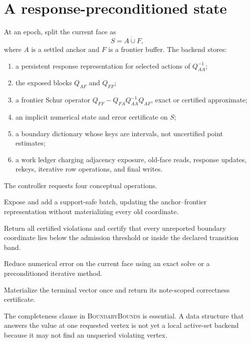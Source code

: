 \section{A response-preconditioned state}
\label{sec:state}

At an epoch, split the current face as
\begin{equation}
 S=A\mathbin{\dot\cup}F,
 \label{eq:anchor-frontier}
\end{equation}
where $A$ is a settled anchor and $F$ is a frontier buffer.  The backend stores:

\begin{enumerate}[label=(\roman*)]
\item a persistent response representation for selected actions of
      $Q_{AA}^{-1}$;
\item the exposed blocks $Q_{AF}$ and $Q_{FF}$;
\item a frontier Schur operator
      $Q_{FF}-Q_{FA}Q_{AA}^{-1}Q_{AF}$, exact or certified approximate;
\item an implicit numerical state and error certificate on $S$;
\item a boundary dictionary whose keys are intervals, not uncertified point
      estimates;
\item a work ledger charging adjacency exposure, old-face reads, response
      updates, rekeys, iterative row operations, and final writes.
\end{enumerate}

The controller requests four conceptual operations.

\begin{description}[leftmargin=2.8cm,style=nextline]
\item[\textsc{Expand}$(T)$]
Expose and add a support-safe batch, updating the anchor--frontier
representation without materializing every old coordinate.
\item[\textsc{BoundaryBounds}]
Return all certified violations and certify that every unreported boundary
coordinate lies below the admission threshold or inside the declared
transition band.
\item[\textsc{Repair}$(\delta)$]
Reduce numerical error on the current face using an exact solve or a
preconditioned iterative method.
\item[\textsc{Finalize}]
Materialize the terminal vector once and return its note-scoped correctness
certificate.
\end{description}

The completeness clause in \textsc{BoundaryBounds} is essential.  A data
structure that answers the value at one requested vertex is not yet a local
active-set backend because it may not find an unqueried violating vertex.
